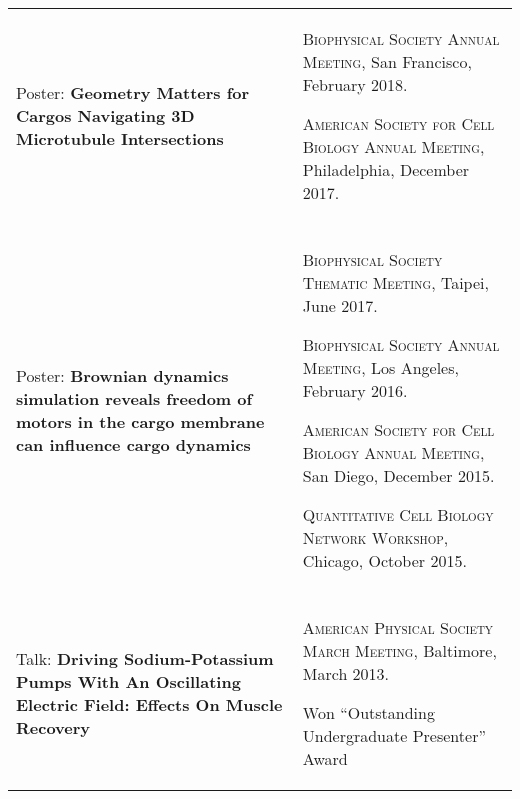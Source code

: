 \documentclass[letterpaper,10pt]{article} %
\makeatletter
\newcommand\cellwidth{\TX@col@width}
\makeatother
\begin{document}
\begin{tabularx}{\textwidth}{p{} | X}
\begin{minipage}{.4\textwidth}
Poster: \textbf{Geometry Matters for Cargos Navigating 3D Microtubule Intersections}
\end{minipage}
&
\begin{minipage}{\cellwidth}
\begin{description}[itemsep=.25ex,labelsep=0em]
\item \textsc{Biophysical Society Annual Meeting}, San Francisco, February 2018.
\item \textsc{American Society for Cell Biology Annual Meeting}, Philadelphia, December 2017.
\end{description}
\end{minipage} \\

\multicolumn{2}{c}{} \\

\begin{minipage}{.4\textwidth}
Poster: \textbf{Brownian dynamics simulation reveals freedom of motors in the cargo membrane can influence cargo dynamics}
\end{minipage}
&
\begin{minipage}{\cellwidth}
\begin{description}[itemsep=.25ex,labelsep=0em]
\item \textsc{Biophysical Society Thematic Meeting}, Taipei, June 2017.
\item \textsc{Biophysical Society Annual Meeting}, Los Angeles, February 2016.
\item \textsc{American Society for Cell Biology Annual Meeting}, San Diego, December 2015.
\item \textsc{Quantitative Cell Biology Network Workshop}, Chicago, October 2015.
\end{description}
\end{minipage} \\

\multicolumn{2}{c}{} \\

\begin{minipage}{.4\textwidth}
Talk: \textbf{Driving Sodium-Potassium Pumps With An Oscillating Electric Field: Effects On Muscle Recovery}
\end{minipage}
&
\begin{minipage}{\cellwidth}
\begin{description}[itemsep=.25ex,labelsep=0em]
\item \textsc{American Physical Society March Meeting}, Baltimore, March 2013.
\item Won ``Outstanding Undergraduate Presenter'' Award
\end{description}
\end{minipage} 
\end{tabularx}
\end{document}
